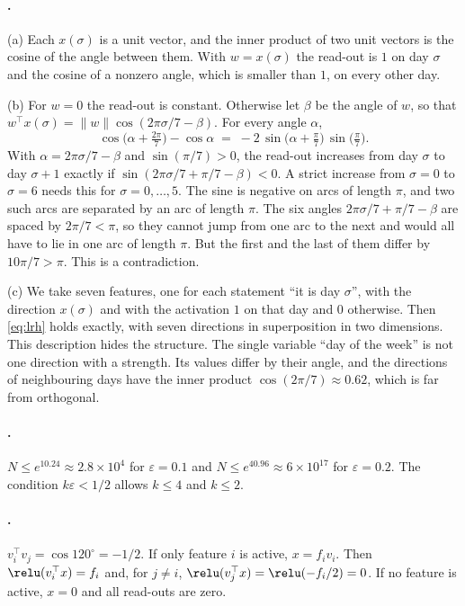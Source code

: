 {\paragraph{.}
(a) Each $x(\sigma)$ is a unit vector, and the inner product of two unit vectors is the cosine of the angle between
them. With $w=x(\sigma)$ the read-out is $1$ on day $\sigma$ and the cosine of a nonzero angle, which is smaller
than $1$, on every other day.

(b) For $w=0$ the read-out is constant. Otherwise let $\beta$ be the angle of $w$, so that
$w^\top x(\sigma)=\|w\|\cos(2\pi\sigma/7-\beta)$. For every angle $\alpha$,
\[
\cos\!\big(\alpha+\tfrac{2\pi}{7}\big)-\cos\alpha \;=\; -2\,\sin\!\big(\alpha+\tfrac{\pi}{7}\big)\,\sin\!\big(\tfrac{\pi}{7}\big).
\]
With $\alpha=2\pi\sigma/7-\beta$ and $\sin(\pi/7)>0$, the read-out increases from day $\sigma$ to day $\sigma+1$
exactly if $\sin(2\pi\sigma/7+\pi/7-\beta)<0$. A strict increase from $\sigma=0$ to $\sigma=6$ needs this for
$\sigma=0,\dots,5$. The sine is negative on arcs of length $\pi$, and two such arcs are separated by an arc of
length $\pi$. The six angles $2\pi\sigma/7+\pi/7-\beta$ are spaced by $2\pi/7<\pi$, so they cannot jump from one arc
to the next and would all have to lie in one arc of length $\pi$. But the first and the last of them differ by
$10\pi/7>\pi$. This is a contradiction.

(c) We take seven features, one for each statement ``it is day $\sigma$'', with the direction $x(\sigma)$ and with
the activation $1$ on that day and $0$ otherwise. Then \eqref{eq:lrh} holds exactly, with seven directions in
superposition in two dimensions. This description hides the structure. The single variable ``day of the week'' is
not one direction with a strength. Its values differ by their angle, and the directions of neighbouring days have
the inner product $\cos(2\pi/7)\approx0.62$, which is far from orthogonal.

\paragraph{.}
$N\le e^{10.24}\approx2.8\times10^4$ for $\varepsilon=0.1$ and $N\le e^{40.96}\approx6\times10^{17}$ for
$\varepsilon=0.2$. The condition $k\varepsilon<1/2$ allows $k\le4$ and $k\le2$.

\paragraph{.}
$v_i^\top v_j=\cos120^\circ=-1/2$. If only feature $i$ is active, $x=f_iv_i$. Then $\relu(v_i^\top x)=f_i$ and, for
$j\ne i$, $\relu(v_j^\top x)=\relu(-f_i/2)=0$. If no feature is active, $x=0$ and all read-outs are zero.

}
